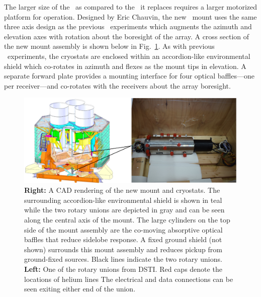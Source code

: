 \documentclass[]{spie}  %
\begin{document}
The larger size of the \biceparray\ as compared to the \keckarray\ it replaces
requires a larger motorized platform for operation. Designed by Eric Chauvin,
the new \biceparray\ mount uses the same three axis design as the previous
\bk\ experiments which augments the azimuth and elevation axes with
rotation about the boresight of the array. A
cross section of the new mount assembly is shown below in Fig.~\ref{fig:bamount}.
As with previous \bk\ experiments, the cryostats
are enclosed within an accordion-like environmental shield which co-rotates in
azimuth and flexes as the mount tips in elevation. A separate forward
plate provides a mounting interface for four optical baffles---one per
receiver---and co-rotates with the receivers about the array boresight.


\begin{figure} [hb]
	\begin{center}
		\includegraphics{mount.png}
	\end{center}
	\caption{\textbf{Right:} A CAD rendering of the new \biceparray mount and cryostats. The surrounding
	accordion-like environmental shield is shown in teal while the two rotary
	unions are depicted in gray and can be seen along the central axis of the
	mount. The large cylinders on the top side of the mount assembly are
	the co-moving absorptive optical baffles that reduce sidelobe response. A fixed
	ground shield (not shown) surrounds this mount assembly and reduces pickup from
	ground-fixed sources. Black lines indicate the two rotary unions.
	\textbf{Left:} One of the rotary unions from DSTI. Red caps denote the
	locations of helium lines The electrical and data connections
	can be seen exiting either end of the union.}
	\label{fig:bamount}
\end{figure}

\clearpage
\end{document}
